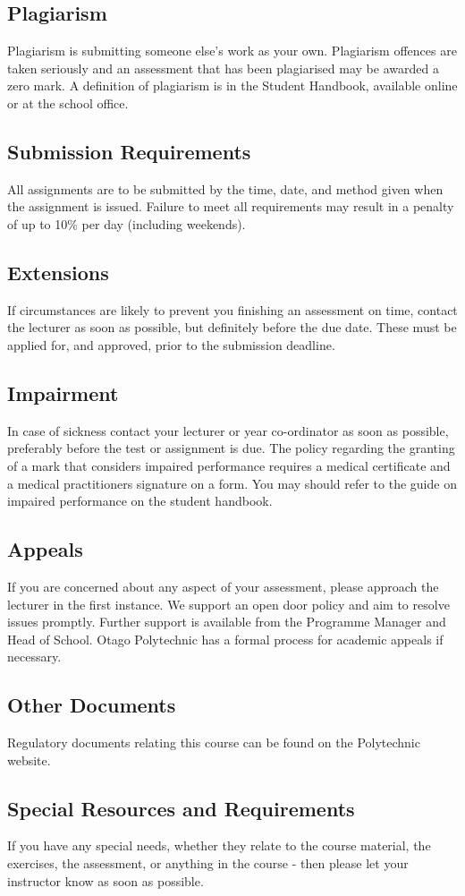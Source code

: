 \documentclass{article}
\begin{document}
\subsection*{Plagiarism}
Plagiarism is submitting someone else's work as your own.  Plagiarism offences are taken seriously and an
assessment that has been plagiarised may be awarded a zero mark.  A definition of plagiarism is in the Student Handbook,
available online or at the school office.

\subsection*{Submission Requirements}
All assignments are to be submitted by the time, date, and method given when the assignment is issued.
Failure to meet all requirements may result in a penalty of up to 10\% per day (including
weekends). 

\subsection*{Extensions}
If circumstances are likely to prevent you finishing an assessment on time, contact the lecturer as soon 
as possible, but definitely before the due date.  These must be applied for, and approved, prior to the submission deadline.

\subsection*{Impairment}
In case of sickness contact your lecturer or year co-ordinator as soon as possible, preferably before the test or
assignment is due.  The policy regarding the granting of a mark that considers impaired performance requires a medical
certificate and a medical practitioners signature on a form. You may should refer to the guide on impaired performance
on the student handbook.

\subsection*{Appeals}
If you are concerned about any aspect of your assessment, please approach the lecturer in the first instance.  We support
an open door policy and aim to resolve issues promptly.  Further support is available from the Programme
Manager and Head of School. Otago Polytechnic has a formal process for academic appeals if necessary.

\subsection*{Other Documents}
Regulatory documents relating this course can be found on the Polytechnic website.

\subsection*{Special Resources and Requirements}
If you have any special needs, whether they relate to the course material, the exercises, the assessment, or anything in the course -
then please let your instructor know as soon as possible.
\end{document}
